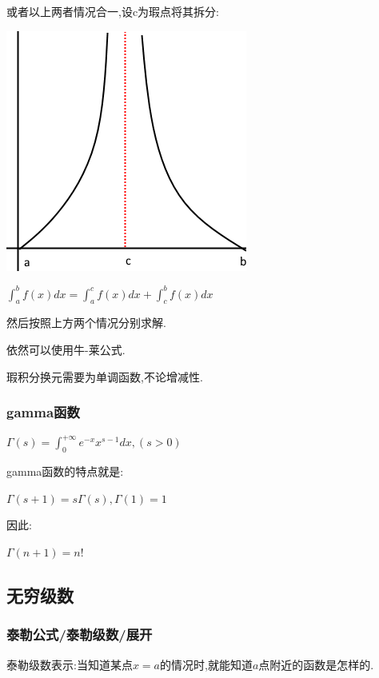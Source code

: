 \documentclass[UTF8,12pt]{ctexbook}
\newcommand{\defFunction}[1]{f(#1)}
\newcommand{\definiteIntegral}[2]{\int^{#1}_{#2}}
\begin{document}
{{{{  或者以上两者情况合一,设c为瑕点将其拆分:

  \begin{center}
    \includegraphics{resources/infityFunctionUnormalIntegral3.png}
  \end{center}

  $\definiteIntegral{b}{a}\defFunction{x}dx = \definiteIntegral{c}{a}\defFunction{x}dx + \definiteIntegral{b}{c}\defFunction{x}dx$

  然后按照上方两个情况分别求解.

  依然可以使用牛-莱公式.

  瑕积分换元需要为单调函数,不论增减性.

}%

\subsubsection{gamma函数}{
$\varGamma(s) = \definiteIntegral{+\infty}{0}e^{-x}x^{s-1}dx, (s > 0)$

gamma函数的特点就是:

$\varGamma(s + 1) = s\varGamma(s), \varGamma(1) = 1$

因此:

$\varGamma(n+1) = n!$

}%

}%

\subsection{无穷级数}{

\subsubsection{泰勒公式/泰勒级数/展开}{
泰勒级数表示:当知道某点$x = a$的情况时,就能知道$a$点附近的函数是怎样的.

}}}}
\end{document}

